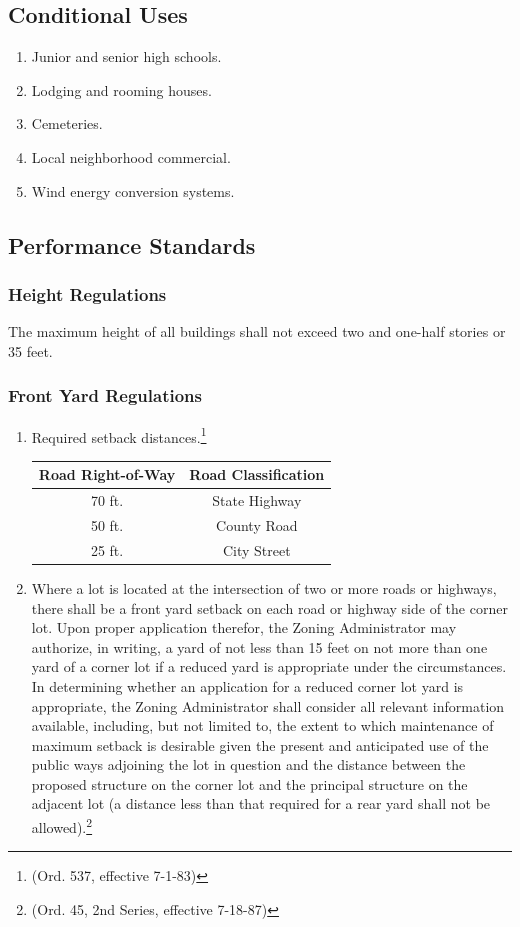 \subsection{Conditional Uses}
\begin{enumerate}[{\indent}1)]
    \item Junior and senior high schools.
    \item Lodging and rooming houses.
    \item Cemeteries.  
    \item Local neighborhood commercial.  
    \item Wind energy conversion systems.
\end{enumerate}
\subsection{Performance Standards}
\subsubsection{Height Regulations}
The maximum height of all buildings shall not exceed two and one-half stories or 35 feet.
\subsubsection{Front Yard Regulations}
\begin{enumerate}[{\indent}a)]
    \item Required setback distances.\footnote{(Ord. 537, effective 7-1-83)}        
        \begin{center}
        \begin{tabular}{|c|c|}
            \hline
            \textbf{Road Right-of-Way} & \textbf{Road Classification}\\
            \hline
            70 ft. & State Highway\\
            \hline
            50 ft. & County Road\\
            \hline
            25 ft. & City Street\\
            \hline
        \end{tabular}
        \end{center}
    \item Where a lot is located at the intersection of two or more roads or highways, there shall be a front yard setback on each road or highway side of the corner lot. Upon proper application therefor, the Zoning Administrator may authorize, in writing, a yard of not less than 15 feet on not more than one yard of a corner lot if a reduced yard is appropriate under the circumstances. In determining whether an application for a reduced corner lot yard is appropriate, the Zoning Administrator shall consider all relevant information available, including, but not limited to, the extent to which maintenance of maximum setback is desirable given the present and anticipated use of the public ways adjoining the lot in question and the distance between the proposed structure on the corner lot and the principal structure on the adjacent lot (a distance less than that required for a rear yard shall not be allowed).\footnote{(Ord. 45, 2nd Series, effective 7-18-87)}
\end{enumerate}
